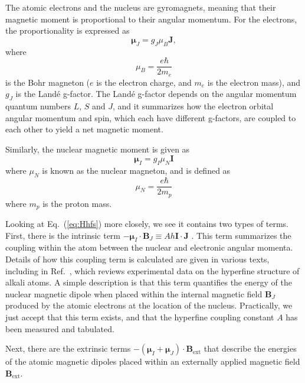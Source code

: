 \documentclass{../lab}
\begin{document}
The atomic electrons and the nucleus are gyromagnets, meaning that their magnetic moment is proportional to their angular momentum.  For the electrons, the proportionality is expressed as
\begin{equation}
  \boldsymbol{\mu}_J = g_J \mu_B \mathbf{J},  
\end{equation} where
\begin{equation}
    \mu_B = \frac{e \hbar}{2 m_e}
\end{equation}
is the Bohr magneton ($e$ is the electron charge, and $m_e$ is the electron mass), and $g_J$ is the Land\'{e} g-factor.  The Land\'{e} g-factor depends on the angular momentum quantum numbers $L$, $S$ and $J$, and it summarizes how the electron orbital angular momentum and spin, which each have different g-factors, are coupled to each other to yield a net magnetic moment.

Similarly, the nuclear magnetic moment is given as
\begin{equation}
    \boldsymbol{\mu}_I = g_I \mu_N \mathbf{I}
\end{equation}
where $\mu_N$ is known as the nuclear magneton, and is defined as
\begin{equation}
    \mu_N = \frac{e \hbar}{2 m_p}
\end{equation}
where $m_p$ is the proton mass. 

Looking at Eq.\ (\ref{eq:Hhfs}) more closely, we see it contains two types of terms.  First, there is the intrinsic term $-\boldsymbol{\mu}_I \cdot \mathbf{B}_J \equiv A h \mathbf{I} \cdot \mathbf{J}$ \cite{arim77}.  This term summarizes the coupling within the atom between the nuclear and electronic angular momenta.  Details of how this coupling term is calculated are given in various texts, including in Ref.\ \cite{arim77}, which reviews experimental data on the hyperfine structure of alkali atoms.  A simple description is that this term quantifies the energy of the nuclear magnetic dipole when placed within the internal magnetic field $\mathbf{B}_J$ produced by the atomic electrons at the location of the nucleus.  Practically, we just accept that this term exists, and that the hyperfine coupling constant $A$ has been measured and tabulated.

Next, there are the extrinsic terms $- \left(\boldsymbol{\mu}_I + \boldsymbol{\mu}_J\right) \cdot \mathbf{B}_\mathrm{ext}$ that describe the energies of the atomic magnetic dipoles placed within an externally applied magnetic field $\mathbf{B}_\mathrm{ext}$.
\end{document}
